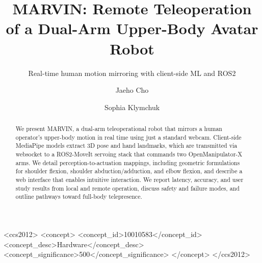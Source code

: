 \documentclass[sigconf]{acmart}
\begin{document}
\title{MARVIN: Remote Teleoperation of a Dual-Arm Upper-Body Avatar Robot}
\subtitle{Real-time human motion mirroring with client-side ML and ROS2}

\author{Jaeho Cho}
\author{Sophia Klymchuk}
\authornotemark[1]

\renewcommand{\shortauthors}{Last}

\begin{abstract}
We present MARVIN, a dual-arm teleoperational robot that mirrors a human operator's upper-body motion in real time using just a standard webcam. Client-side MediaPipe models extract 3D pose and hand landmarks, which are transmitted via websocket to a ROS2-MoveIt servoing stack that commands two OpenManipulator-X arms. We detail perception-to-actuation mappings, including geometric formulations for shoulder flexion, shoulder abduction/adduction, and elbow flexion, and describe a web interface that enables intuitive interaction. We report latency, accuracy, and user study results from local and remote operation, discuss safety and failure modes, and outline pathways toward full-body telepresence.
\end{abstract}

\begin{CCSXML}
<ccs2012>
   <concept>
       <concept_id>10010583</concept_id>
       <concept_desc>Hardware</concept_desc>
       <concept_significance>500</concept_significance>
       </concept>
 </ccs2012>
\end{CCSXML}




\maketitle
\end{document}
